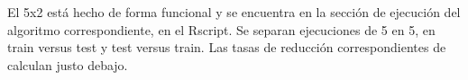 \documentclass[	DIV=calc,%
							paper=a4,%
							fontsize=11pt,
							onecolumn]{scrartcl}	 					%
\begin{document}
El 5x2 está hecho de forma funcional y se encuentra en la sección de ejecución del algoritmo correspondiente, en el Rscript. Se separan ejecuciones de 5 en 5, en train versus test y test versus train. Las tasas de reducción correspondientes de calculan justo debajo. \newline
\end{document}
